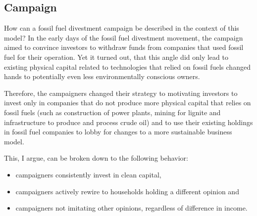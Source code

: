\subsection{Campaign}
How can a fossil fuel divestment campaign be described in the context of this model?
In the early days of the fossil fuel divestment movement, the campaign aimed to convince investors to withdraw funds from companies that used fossil fuel for their operation. Yet it turned out, that this angle did only lead to existing physical capital related to technologies that relied on fossil fuels changed hands to potentially even less environmentally conscious owners.
\par
Therefore, the campaigners changed their strategy to motivating investors to invest only in companies that do not produce more physical capital that relies on fossil fuels (such as construction of power plants, mining for lignite and infrastructure to produce and process crude oil) and to use their existing holdings in fossil fuel companies to lobby for changes to a more sustainable business model.
\par
This, I argue, can be broken down to the following behavior:
\begin{itemize}
	\item campaigners consistently invest in clean capital,
	\item campaigners actively rewire to households holding a different opinion and
	\item campaigners not imitating other opinions, regardless of difference in income.
\end{itemize}
